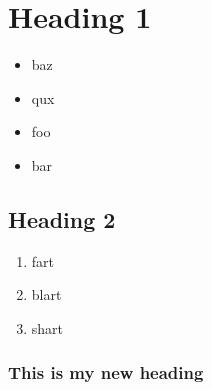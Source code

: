 \documentclass{article}
\begin{document}
\section{Heading 1}
\begin{itemize}
    \item baz
    \item qux
\end{itemize}

\begin{itemize}
    \item foo
    \item bar
\end{itemize}

\subsection{Heading 2}
\begin{enumerate}
    \item  fart
    \item  blart
    \item  shart
\end{enumerate}

\subsubsection{This is my new heading}
\end{document}
